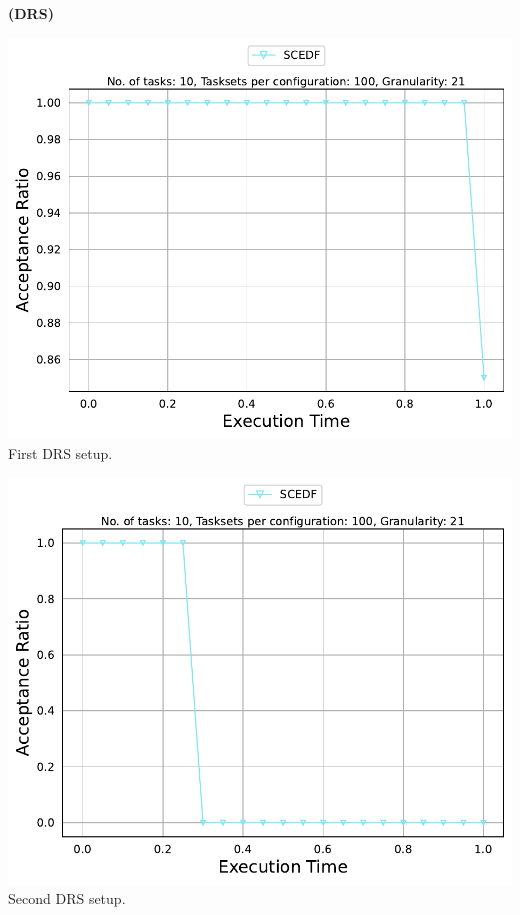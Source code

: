 \documentclass[]{article}
\begin{document}
	\begin{minipage}[t]{0.48\linewidth}
		\centering
		\textbf{(DRS)}
		\vspace{0.3cm}
		
		\includegraphics[width=\linewidth]{SCEDF_1st Setup.pdf}
		First DRS setup.
		\vspace{0.3cm}
		
		\includegraphics[width=\linewidth]{SCEDF_2nd Setup.pdf}
		Second DRS setup.
		\vspace{0.3cm}


\end{minipage}
\end{document}
